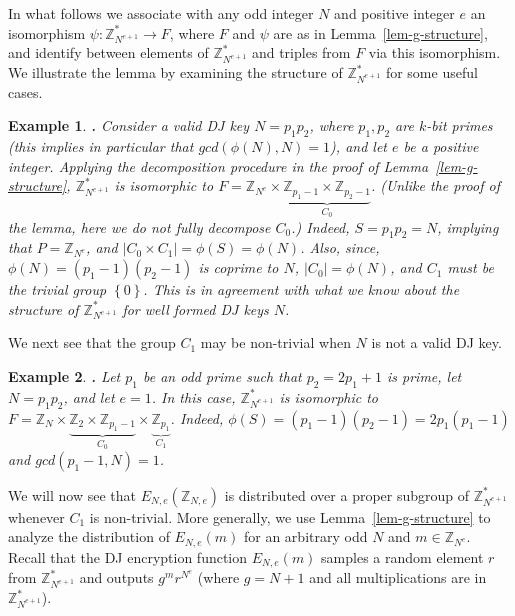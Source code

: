 \documentclass{article}
\newcommand{\encdj}{{E}_{N,e}}
\newcommand{\set}[1]{\left\{#1\right\}}
\newcommand{\size}[1]{|#1|}
\newcommand{\Z}{{\mathbb{Z}}}
\newtheorem{EXAMPLE}{Example}[section]
\newenvironment{example}{\begin{EXAMPLE} \hspace{-.85em} {\bf .} \rm}%
	{\end{EXAMPLE}}
\newcommand{\U}[1]{\mathbb{Z}_{#1}^*}
\begin{document}
In what follows we associate with any odd integer $N$ and positive
integer $e$ an isomorphism $\psi:\U{N^{e+1}}\to F$, where $F$ and $\psi$ are as in Lemma~\ref{lem-g-structure}, and identify between
elements of $\U{N^{e+1}}$ and triples from $F$ via this
isomorphism. We illustrate the lemma by examining the structure of
$\U{N^{e+1}}$ for some useful cases.
\begin{example}
\label{ex-valid} Consider a valid DJ key $N=p_1p_2$, where
$p_1,p_2$ are $k$-bit primes (this implies in particular that
$gcd(\phi(N),N)=1$), and let $e$ be a positive integer. Applying
the decomposition procedure in the proof of
Lemma~\ref{lem-g-structure}, $\U{N^{e+1}}$ is isomorphic to
$F=\Z_{N^e}\times \underbrace{\Z_{p_1-1}\times\Z_{p_2-1}}_{C_0}$.
(Unlike the proof of the lemma, here we do not fully decompose
$C_0$.) Indeed, $S=p_1p_2=N$, implying that $P=\Z_{N^e}$, and
$\size{C_0\times C_1}=\phi(S)=\phi(N)$. Also, since,
$\phi(N)=(p_1-1)(p_2-1)$ is coprime to $N$, $\size{C_0}=\phi(N)$,
and $C_1$ must be the trivial group $\set{0}$. This is in agreement
with what we know about the structure of $\U{N^{e+1}}$ for well
formed DJ keys $N$.
\end{example}
We next see that the group $C_1$ may be non-trivial when $N$ is not
a valid DJ key.
\begin{example}
\label{ex-harmful} Let $p_1$ be an odd prime such that $p_2=2p_1+1$
is prime, let $N=p_1p_2$, and let $e=1$. In this case,
$\U{N^{e+1}}$ is isomorphic to
$F=\Z_N\times\underbrace{\Z_2\times\Z_{p_1-1}}_{C_0}\times
\underbrace{\Z_{p_1}}_{C_1}$. Indeed,
$\phi(S)=(p_1-1)(p_2-1)=2p_1(p_1-1)$ and $gcd(p_1-1,N)=1$.
\end{example}

We will now see that $\encdj(\Z_{N,e})$ is distributed over a
proper subgroup of $\U{N^{e+1}}$ whenever $C_1$ is non-trivial.
More generally, we use Lemma~\ref{lem-g-structure} to analyze the
distribution of $\encdj(m)$ for an arbitrary odd $N$ and
$m\in\Z_{N^e}$. Recall that the DJ encryption function $\encdj(m)$
samples a random element $r$ from ${\U{N^{e+1}}}$ and outputs
$g^mr^{N^e}$ (where $g=N+1$ and all multiplications are in
$\U{N^{e+1}}$).
\end{document}

